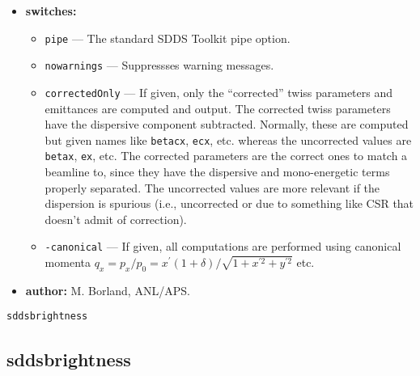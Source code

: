 \documentclass[11pt]{article}
\begin{document}
\begin{itemize}
\begin{itemize}
\end{itemize}

\item {\bf switches:}
\begin{itemize}
\item {\tt pipe} --- The standard SDDS Toolkit pipe option.
\item {\tt nowarnings} --- Suppressses warning messages.
\item {\tt correctedOnly} --- If given, only the ``corrected'' twiss parameters and emittances are computed and
 output.  The corrected twiss parameters have the dispersive component subtracted.  Normally, these are
computed but given names like \verb|betacx|, \verb|ecx|, etc. whereas the uncorrected values are 
\verb|betax|, \verb|ex|, etc. The corrected parameters are the correct ones to match a beamline to, since they have the
 dispersive and mono-energetic terms properly separated.  The uncorrected values are more relevant if the dispersion
is spurious (i.e., uncorrected or due to something like CSR that doesn't admit of correction).
\item {\tt -canonical} --- If given, all computations are performed using canonical momenta 
  $q_x = p_x/p_0 = x^\prime (1 + \delta)/\sqrt{1 + x^{\prime 2} + y^{\prime 2}}$ etc.
\end{itemize}

\item {\bf author:} M. Borland, ANL/APS.
\end{itemize}

\newpage
\begin{center}{\Large\verb|sddsbrightness|}\end{center}
\subsection{sddsbrightness}
\end{document}
